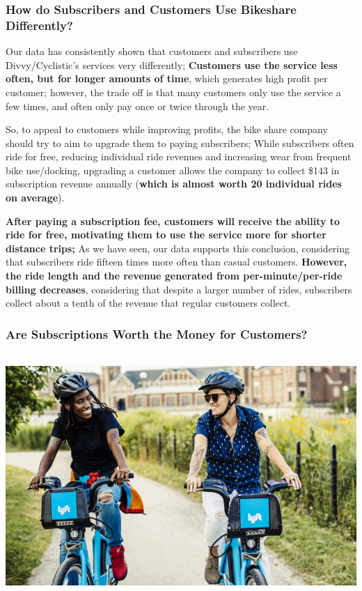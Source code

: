 \documentclass[
]{article}
\begin{document}
\subsubsection{How do Subscribers and Customers Use Bikeshare
Differently?}\label{how-do-subscribers-and-customers-use-bikeshare-differently}

Our data has consistently shown that customers and subscribers use
Divvy/Cyclistic's services very differently; \textbf{Customers use the
service less often, but for longer amounts of time}, which generates
high profit per customer; however, the trade off is that many customers
only use the service a few times, and often only pay once or twice
through the year.

So, to appeal to customers while improving profits, the bike share
company should try to aim to upgrade them to paying subscribers; While
subscribers often ride for free, reducing individual ride revenues and
increasing wear from frequent bike use/docking, upgrading a customer
allows the company to collect \$143 in subscription revenue annually
(\textbf{which is almost worth 20 individual rides on average}).

\textbf{After paying a subscription fee, customers will receive the
ability to ride for free, motivating them to use the service more for
shorter distance trips;} As we have seen, our data supports this
conclusion, considering that subscribers ride fifteen times more often
than casual customers. \textbf{However, the ride length and the revenue
generated from per-minute/per-ride billing decreases}, considering that
despite a larger number of rides, subscribers collect about a tenth of
the revenue that regular customers collect.

\subsubsection{Are Subscriptions Worth the Money for
Customers?}\label{are-subscriptions-worth-the-money-for-customers}

\includegraphics[width=700px,height=350px]{DivvyBikeImage}
\end{document}
